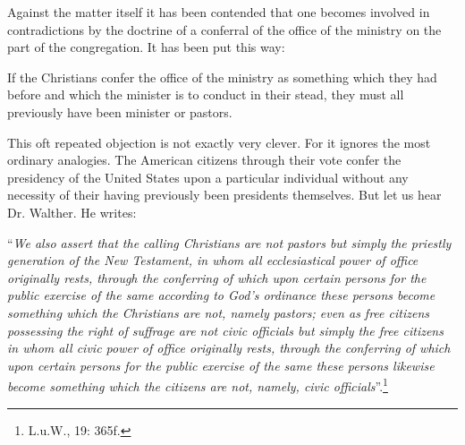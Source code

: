         Against the matter itself it has been contended that one becomes involved in contradictions by the doctrine of a conferral of the office of the ministry on the part of the congregation.  It has been put this way: \begin{displayquote}{\footnotesize If the Christians confer the office of the ministry as something which they had before and which the minister is to conduct in their stead, they must all previously have been minister or pastors.}\end{displayquote}  This oft repeated objection is not exactly very clever.  For it ignores the most ordinary analogies. The American citizens through their vote confer the presidency of the United States upon a particular individual without any necessity of their having previously been presidents themselves.  But let us hear Dr. Walther.  He writes: \begin{displayquote}“\textit{We also assert that the calling Christians are not pastors but simply the priestly generation of the New Testament, in whom all ecclesiastical power of office originally rests, through the conferring of which upon certain persons for the public exercise of the same according to God’s ordinance these persons become something which the Christians are not, namely pastors; even as free citizens possessing the right of suffrage are not civic officials but simply the free citizens in whom all civic power of office originally rests, through the conferring of which upon certain persons for the public exercise of the same these persons likewise become something which the citizens are not, namely, civic officials}”.\footnote{L.u.W., 19: 365f.}\end{displayquote}

